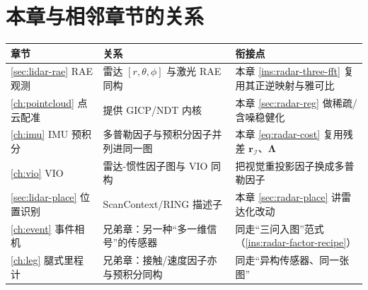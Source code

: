 \section*{本章与相邻章节的关系}
\begin{table}[H]\centering\small
\begin{tabular}{lll}
\toprule
章节 & 关系 & 衔接点 \\
\midrule
\cref{sec:lidar-rae} RAE 观测 & 雷达 $[r,\theta,\phi]$ 与激光 RAE 同构 & 本章 \cref{ins:radar-three-fft} 复用其正逆映射与雅可比 \\
\cref{ch:pointcloud} 点云配准 & 提供 GICP/NDT 内核 & 本章 \cref{sec:radar-reg} 做稀疏/含噪稳健化 \\
\cref{ch:imu} IMU 预积分 & 多普勒因子与预积分因子并列进同一图 & 本章 \cref{eq:radar-cost} 复用残差 $\mathbf r_{\mathcal I}$、$\boldsymbol\Lambda$ \\
\cref{ch:vio} VIO & 雷达-惯性因子图与 VIO 同构 & 把视觉重投影因子换成多普勒因子 \\
\cref{sec:lidar-place} 位置识别 & ScanContext/RING 描述子 & 本章 \cref{sec:radar-place} 讲雷达化改动 \\
\cref{ch:event} 事件相机 & 兄弟章：另一种“多一维信号”的传感器 & 同走“三问入图”范式（\cref{ins:radar-factor-recipe}） \\
\cref{ch:leg} 腿式里程计 & 兄弟章：接触/速度因子亦与预积分同构 & 同走“异构传感器、同一张图” \\
\bottomrule
\end{tabular}
\end{table}

